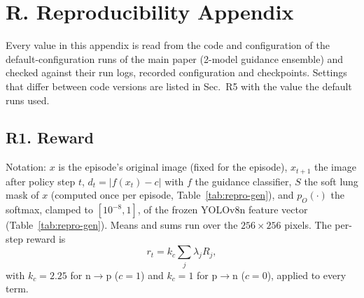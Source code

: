%

\section*{R. Reproducibility Appendix}
\label{sec:appendix-repro}
\setcounter{table}{0}
\renewcommand{\thetable}{R\arabic{table}}

Every value in this appendix is read from the code and configuration of the default-configuration runs of the main paper (2-model guidance ensemble) and checked against their run logs, recorded configuration and checkpoints. Settings that differ between code versions are listed in Sec.~R5 with the value the default runs used.

\subsection*{R1. Reward}
\label{sec:repro-reward}

Notation: $x$ is the episode's original image (fixed for the episode), $x_{t+1}$ the image after policy step $t$, $d_t = |f(x_t) - c|$ with $f$ the guidance classifier, $S$ the soft lung mask of $x$ (computed once per episode, Table~\ref{tab:repro-gen}), and $p_O(\cdot)$ the softmax, clamped to $[10^{-8}, 1]$, of the frozen YOLOv8n feature vector (Table~\ref{tab:repro-gen}). Means and sums run over the $256 \times 256$ pixels. The per-step reward is
\begin{equation*}
r_t = k_c \textstyle\sum_j \lambda_j R_j,
\end{equation*}
with $k_c = 2.25$ for n$\to$p ($c = 1$) and $k_c = 1$ for p$\to$n ($c = 0$), applied to every term.

